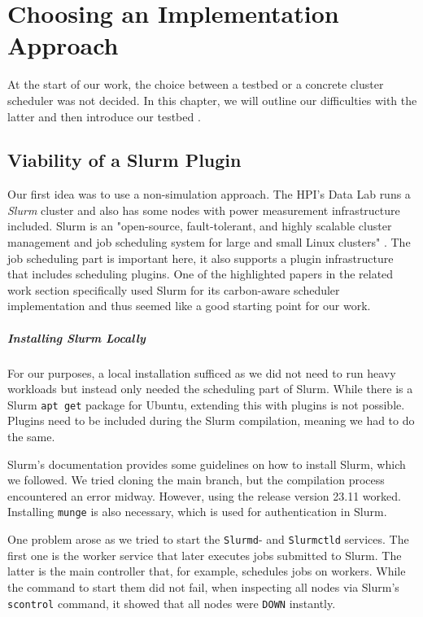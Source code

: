 \chapter{Choosing an Implementation Approach}

At the start of our work, the choice between a testbed or a concrete cluster scheduler was not decided. 
In this chapter, we will outline our difficulties with the latter and then introduce our testbed \programname{}.

\section{Viability of a Slurm Plugin}
\label{subsec:slurm_plugin}

Our first idea was to use a non-simulation approach. 
The HPI's Data Lab  runs a \emph{Slurm} cluster and also has some nodes with power measurement infrastructure included. 
Slurm is an "open-source, fault-tolerant, and highly scalable cluster management and job scheduling system for large and small Linux clusters" .
The job scheduling part is important here, it also supports a plugin infrastructure that includes scheduling plugins. 
One of the highlighted papers \cite{inigo_goiri_greenslot_2011} in the related work section specifically used Slurm for its carbon-aware scheduler implementation and thus seemed like a good starting point for our work.

\paragraph{Installing Slurm Locally}

For our purposes, a local installation sufficed as we did not need to run heavy workloads but instead only needed the scheduling part of Slurm. 
While there is a Slurm \verb|apt get| package for Ubuntu, extending this with plugins is not possible. 
Plugins need to be included during the Slurm compilation, meaning we had to do the same.

Slurm's documentation provides some guidelines on how to install Slurm, which we followed. 
We tried cloning the main branch, but the compilation process encountered an error midway. However, using the release version 23.11 worked.
Installing \verb|munge|  is also necessary, which is used for authentication in Slurm.

One problem arose as we tried to start the \verb|Slurmd|- and \verb|Slurmctld| services. The first one is the worker service that later executes jobs submitted to Slurm. The latter is the main controller that, for example, schedules jobs on workers. While the command to start them did not fail, when inspecting all nodes via Slurm's \verb|scontrol| command, it showed that all nodes were \verb|DOWN| instantly.

